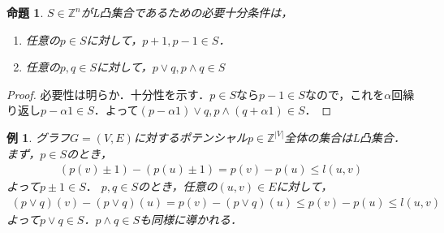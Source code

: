 \documentclass[a4paper]{jsarticle}
\newcommand{\abs}[1]{ \left| #1 \right| }
\newcommand{\Int}{\mathbb{Z}}
\theoremstyle{break}
\newtheorem{prop}{命題}[section]
\newtheorem{proof}{証明}[section]
\newtheorem{example}{例}[section]
\begin{document}
\begin{prop}
  $S\in \Int^n$がL凸集合であるための必要十分条件は，
  \begin{enumerate}
    \item 任意の$p\in S$に対して，$p+1,p-1 \in S$．
    \item 任意の$p,q \in S$に対して，$p\lor q ,p\land q \in S$
  \end{enumerate}
\end{prop}
\begin{proof}
  必要性は明らか．十分性を示す．$p\in S$なら$p-1 \in S$なので，これを$\alpha$回繰り返し$p-\alpha 1 \in S$．よって$(p-\alpha 1 ) \lor q , p\land ( q+\alpha 1) \in S$．
\end{proof}
\begin{example}
  グラフ$G=(V,E)$に対するポテンシャル$p\in \Int^{\abs{V}}$全体の集合はL凸集合．まず，$p\in S$のとき，
  \begin{align*}
    (p(v)\pm 1) - (p(u) \pm 1) = p(v) - p(u) \leq l(u,v)
  \end{align*}
  よって$p\pm 1\in S．$
  $p,q\in S$のとき，任意の$(u,v) \in E$に対して，
  \begin{align*}
    (p\lor q)(v) - (p\lor q)(u) = p(v) - (p\lor q)(u) \leq p(v) - p(u) \leq l(u,v)
  \end{align*}
  よって$p\lor q\in S$．$p\land q\in S$も同様に導かれる．
\end{example}
\end{document}
